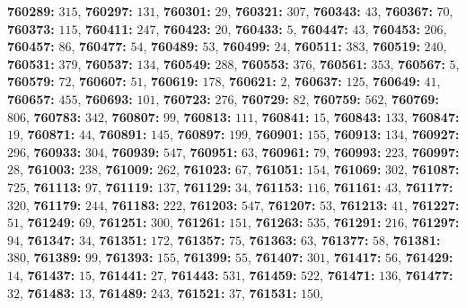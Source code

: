 \textsf{\bfseries 760289:} $315$, \textsf{\bfseries 760297:} $131$, \textsf{\bfseries 760301:} $29$, \textsf{\bfseries 760321:} $307$, \textsf{\bfseries 760343:} $43$, \textsf{\bfseries 760367:} $70$, \textsf{\bfseries 760373:} $115$, \textsf{\bfseries 760411:} $247$, \textsf{\bfseries 760423:} $20$, \textsf{\bfseries 760433:} $5$, \textsf{\bfseries 760447:} $43$, \textsf{\bfseries 760453:} $206$, \textsf{\bfseries 760457:} $86$, \textsf{\bfseries 760477:} $54$, \textsf{\bfseries 760489:} $53$, \textsf{\bfseries 760499:} $24$, \textsf{\bfseries 760511:} $383$, \textsf{\bfseries 760519:} $240$, \textsf{\bfseries 760531:} $379$, \textsf{\bfseries 760537:} $134$, \textsf{\bfseries 760549:} $288$, \textsf{\bfseries 760553:} $376$, \textsf{\bfseries 760561:} $353$, \textsf{\bfseries 760567:} $5$, \textsf{\bfseries 760579:} $72$, \textsf{\bfseries 760607:} $51$, \textsf{\bfseries 760619:} $178$, \textsf{\bfseries 760621:} $2$, \textsf{\bfseries 760637:} $125$, \textsf{\bfseries 760649:} $41$, \textsf{\bfseries 760657:} $455$, \textsf{\bfseries 760693:} $101$, \textsf{\bfseries 760723:} $276$, \textsf{\bfseries 760729:} $82$, \textsf{\bfseries 760759:} $562$, \textsf{\bfseries 760769:} $806$, \textsf{\bfseries 760783:} $342$, \textsf{\bfseries 760807:} $99$, \textsf{\bfseries 760813:} $111$, \textsf{\bfseries 760841:} $15$, \textsf{\bfseries 760843:} $133$, \textsf{\bfseries 760847:} $19$, \textsf{\bfseries 760871:} $44$, \textsf{\bfseries 760891:} $145$, \textsf{\bfseries 760897:} $199$, \textsf{\bfseries 760901:} $155$, \textsf{\bfseries 760913:} $134$, \textsf{\bfseries 760927:} $296$, \textsf{\bfseries 760933:} $304$, \textsf{\bfseries 760939:} $547$, \textsf{\bfseries 760951:} $63$, \textsf{\bfseries 760961:} $79$, \textsf{\bfseries 760993:} $223$, \textsf{\bfseries 760997:} $28$, \textsf{\bfseries 761003:} $238$, \textsf{\bfseries 761009:} $262$, \textsf{\bfseries 761023:} $67$, \textsf{\bfseries 761051:} $154$, \textsf{\bfseries 761069:} $302$, \textsf{\bfseries 761087:} $725$, \textsf{\bfseries 761113:} $97$, \textsf{\bfseries 761119:} $137$, \textsf{\bfseries 761129:} $34$, \textsf{\bfseries 761153:} $116$, \textsf{\bfseries 761161:} $43$, \textsf{\bfseries 761177:} $320$, \textsf{\bfseries 761179:} $244$, \textsf{\bfseries 761183:} $222$, \textsf{\bfseries 761203:} $547$, \textsf{\bfseries 761207:} $53$, \textsf{\bfseries 761213:} $41$, \textsf{\bfseries 761227:} $51$, \textsf{\bfseries 761249:} $69$, \textsf{\bfseries 761251:} $300$, \textsf{\bfseries 761261:} $151$, \textsf{\bfseries 761263:} $535$, \textsf{\bfseries 761291:} $216$, \textsf{\bfseries 761297:} $94$, \textsf{\bfseries 761347:} $34$, \textsf{\bfseries 761351:} $172$, \textsf{\bfseries 761357:} $75$, \textsf{\bfseries 761363:} $63$, \textsf{\bfseries 761377:} $58$, \textsf{\bfseries 761381:} $380$, \textsf{\bfseries 761389:} $99$, \textsf{\bfseries 761393:} $155$, \textsf{\bfseries 761399:} $55$, \textsf{\bfseries 761407:} $301$, \textsf{\bfseries 761417:} $56$, \textsf{\bfseries 761429:} $14$, \textsf{\bfseries 761437:} $15$, \textsf{\bfseries 761441:} $27$, \textsf{\bfseries 761443:} $531$, \textsf{\bfseries 761459:} $522$, \textsf{\bfseries 761471:} $136$, \textsf{\bfseries 761477:} $32$, \textsf{\bfseries 761483:} $13$, \textsf{\bfseries 761489:} $243$, \textsf{\bfseries 761521:} $37$, \textsf{\bfseries 761531:} $150$, 
